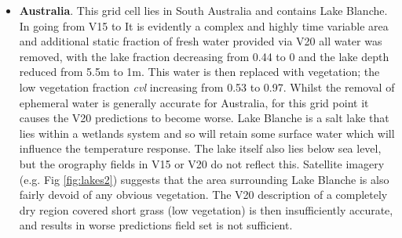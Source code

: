 \documentclass[hess, twostagejnl]{copernicus}
\providecommand{\DIFadd}[1]{{\protect\color{blue} \sf #1}} %
\providecommand{\DIFdel}[1]{{\protect\color{red} \scriptsize #1}} %
\providecommand{\DIFaddbegin}{} %
\providecommand{\DIFaddend}{} %
\providecommand{\DIFdelbegin}{} %
\providecommand{\DIFdelend}{} %
\begin{document}
\begin{itemize}
\item%
\DIFdel{\textbf{Australia}. This grid cell lies in South Australia and contains Lake Blanche. In going from V15 to }\DIFdelend \DIFaddbegin \DIFadd{It is evidently a complex and highly time variable area and additional static fraction of fresh water provided via }\DIFaddend V20 \DIFdelbegin \DIFdel{all water was removed, with the lake fraction decreasing from 0.44 to 0 and the lake depth reduced from 5.5m to 1m. This water is then replaced with vegetation; the low vegetation fraction \textit{cvl} increasing from 0.53 to 0.97. Whilst the removal of ephemeral water is generally accurate for Australia, for this grid point it causes the V20 predictions to become worse. Lake Blanche is a salt lake that lies within a wetlands system and so will retain some surface water which will influence the temperature response. The lake itself also lies below sea level, but the orography fields in V15 or V20 do not reflect this. Satellite imagery (e.g. Fig \ref{fig:lakes2}) suggests that the area surrounding Lake Blanche is also fairly devoid of any obvious vegetation. The V20 description of a completely dry region covered short grass (low vegetation) is then insufficiently accurate, and results in worse predictions}\DIFdelend \DIFaddbegin \DIFadd{field set is not sufficient}\DIFaddend .


\end{itemize}
\end{document}
